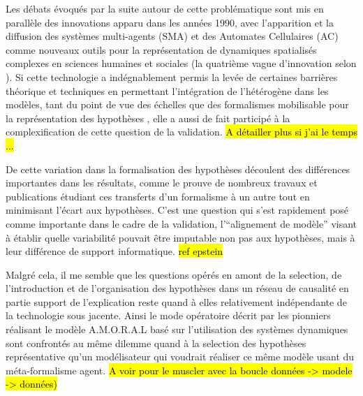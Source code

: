 


Les débats évoqués par la suite autour de cette problématique sont mis en parallèle des innovations apparu dans les années 1990, avec l'apparition et la diffusion des systèmes multi-agents (SMA) et des Automates Cellulaires (AC) comme nouveaux outils pour la représentation de dynamiques spatialisés complexes en sciences humaines et sociales (la quatrième vague d'innovation selon \autocite{Banos2013a}). Si cette technologie a indégnablement permis la levée de certaines barrières théorique et techniques en permettant l'intégration de l'hétérogène dans les modèles, tant du point de vue des échelles que des formalismes mobilisable pour la représentation des hypothèses , elle a aussi de fait participé à la complexification de cette question de la validation. \autocite[38-41]{Varenne2013} \hl{A détailler plus si j'ai le temps ... }

De cette variation dans la formalisation des hypothèses découlent des différences importantes dans les résultats, comme le prouve de nombreux travaux et publications étudiant ces transferts d'un formalisme à un autre tout en minimisant l'écart aux hypothèses. C'est une question qui s'est rapidement posé comme importante dans le cadre de la validation, l'\enquote{alignement de modèle} visant à établir quelle variabilité pouvait être imputable non pas aux hypothèses, mais à leur différence de support informatique. \hl{ref epstein}

Malgré cela, il me semble que les questions opérés en amont de la selection, de l'introduction et de l'organisation des hypothèses dans un réseau de causalité en partie support de l'explication reste quand à elles relativement indépendante de la technologie sous jacente. Ainsi le mode opératoire décrit par les pionniers réalisant le modèle A.M.O.R.A.L basé sur l'utilisation des systèmes dynamiques sont confrontés au même dilemme quand à la selection des hypothèses représentative qu'un modélisateur qui voudrait réaliser ce même modèle usant du méta-formalisme agent. \hl{A voir pour le muscler avec la boucle données -> modele -> données)}


